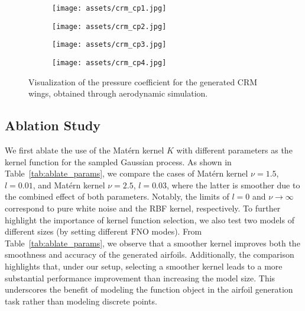 \begin{figure}[t]
    \small
    \centering

    \begin{subfigure}{0.23\textwidth}
        \centering
        \texttt{[image: assets/crm\_cp1.jpg]}
    \end{subfigure}
    \begin{subfigure}{0.23\textwidth}
        \centering
        \texttt{[image: assets/crm\_cp2.jpg]}
    \end{subfigure}
    
    \vspace{0.5cm} %
    
    \begin{subfigure}{0.23\textwidth}
        \centering
        \texttt{[image: assets/crm\_cp3.jpg]}
    \end{subfigure}
    \begin{subfigure}{0.23\textwidth}
        \centering
        \texttt{[image: assets/crm\_cp4.jpg]}
    \end{subfigure}

    \caption{Visualization of the pressure coefficient for the generated CRM wings, obtained through aerodynamic simulation.}
    \label{fig:crm_cp}
\end{figure}


\subsection{Ablation Study}

We first ablate the use of the Matérn kernel $K$ with different parameters as the kernel function for the sampled Gaussian process. 
As shown in Table~\ref{tab:ablate_params}, we compare the cases of Matérn kernel $\nu = 1.5$, $l = 0.01$, and Matérn kernel $\nu = 2.5$, $l = 0.03$, where the latter is smoother due to the combined effect of both parameters. 
Notably, the limits of $l = 0$ and $\nu \to \infty$ correspond to pure white noise and the RBF kernel, respectively.
To further highlight the importance of kernel function selection, we also test two models of different sizes (by setting different FNO modes).
From Table~\ref{tab:ablate_params}, we observe that a smoother kernel improves both the smoothness and accuracy of the generated airfoils. 
Additionally, the comparison highlights that, under our setup, selecting a smoother kernel leads to a more substantial performance improvement than increasing the model size. This underscores the benefit of modeling the function object in the airfoil generation task rather than modeling discrete points.


